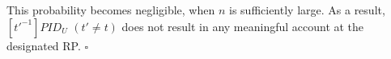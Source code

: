 This probability becomes negligible, when $n$ is sufficiently large.
As a result, $[t'^{-1}]PID_U$ $(t' \neq t)$ does not result in any meaningful account at the designated RP. 
\hfill $\square$








